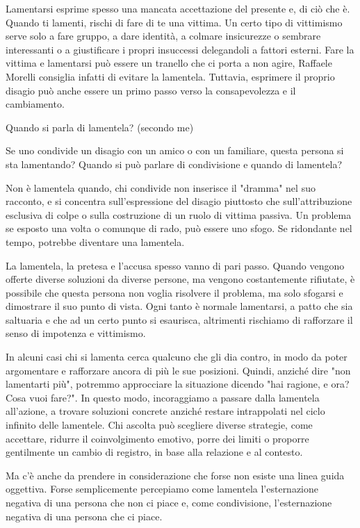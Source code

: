 \documentclass[12pt]{book} %
\begin{document}
Lamentarsi esprime spesso una mancata accettazione del presente e, di ciò che è. Quando ti lamenti, rischi di fare di te una vittima. Un certo tipo di
vittimismo serve solo a fare gruppo, a dare identità, a colmare insicurezze o sembrare interessanti o a giustificare i
propri insuccessi delegandoli a fattori esterni. Fare la vittima e lamentarsi può essere un tranello che ci porta a non agire, Raffaele Morelli consiglia infatti di evitare la lamentela. Tuttavia, esprimere il proprio disagio può anche essere un primo passo verso la consapevolezza e il cambiamento.

\begin{mdframed}[linewidth=1pt]
Quando si parla di lamentela? (secondo me)

Se uno condivide un disagio con un amico o con un familiare, questa persona si sta lamentando? Quando si può parlare di
condivisione e quando di lamentela?

Non è lamentela quando, chi condivide non inserisce il "dramma" nel suo racconto, e si concentra sull'espressione del disagio piuttosto che sull'attribuzione esclusiva di colpe o sulla costruzione di un ruolo di vittima passiva. 
Un problema se esposto una volta o comunque di rado, può essere uno sfogo. Se ridondante nel tempo, potrebbe diventare una lamentela.

La lamentela, la pretesa e l'accusa spesso vanno di pari passo. Quando vengono offerte diverse soluzioni da diverse
persone, ma vengono costantemente rifiutate, è possibile che questa persona non voglia risolvere il problema, ma solo
sfogarsi e dimostrare il suo punto di vista. Ogni tanto è normale lamentarsi, a patto che sia saltuaria e che ad un certo punto si esaurisca, altrimenti rischiamo di rafforzare il senso di impotenza e vittimismo.

In alcuni casi chi si lamenta cerca qualcuno che gli dia contro, in modo da poter argomentare e rafforzare ancora di più le sue
posizioni. Quindi, anziché dire "non lamentarti più", potremmo approcciare la situazione
dicendo "hai ragione, e ora? Cosa vuoi fare?". In questo modo, incoraggiamo a passare dalla
lamentela all'azione, a trovare soluzioni concrete anziché restare intrappolati nel ciclo infinito delle lamentele. 
Chi ascolta può scegliere diverse strategie, come accettare, ridurre il coinvolgimento emotivo, porre dei limiti o proporre gentilmente un cambio di registro, in base alla relazione e al contesto.

Ma c'è anche da prendere in considerazione che forse non esiste una linea guida oggettiva. Forse
semplicemente percepiamo come lamentela l'esternazione negativa di una persona che non ci piace e, come condivisione,
l'esternazione negativa di una persona che ci piace.


\end{mdframed}
\end{document}
